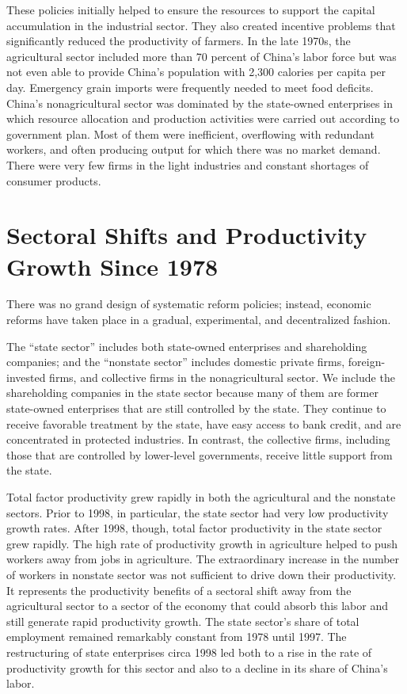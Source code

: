 \documentclass{article}
\begin{document}
    These policies initially helped to ensure the resources to support the capital accumulation in the industrial sector. They also created incentive problems that significantly reduced the productivity of farmers. In the late 1970s, the agricultural sector included more than 70 percent of China’s labor force but was not even able to provide China’s population with 2,300 calories per capita per day. Emergency grain imports were frequently needed to meet food deficits. China’s nonagricultural sector was dominated by the state-owned enterprises in which resource allocation and production activities were carried out according to government plan. Most of them were inefficient, overflowing with redundant workers, and often producing output for which there was no market demand. There were very few firms in the light industries and constant shortages of consumer products.

    \section*{Sectoral Shifts and Productivity Growth Since 1978}
    There was no grand design of systematic reform policies; instead, economic reforms have taken place in a gradual, experimental, and decentralized fashion.

    The “state sector” includes both state-owned enterprises and shareholding companies; and the “nonstate sector” includes domestic private firms, foreign-invested firms, and collective firms in the nonagricultural sector. We include the shareholding companies in the state sector because many of them are former state-owned enterprises that are still controlled by the state. They continue to receive favorable treatment by the state, have easy access to bank credit, and are concentrated in protected industries. In contrast, the collective firms, including those that are controlled by lower-level governments, receive little support from the state.

    Total factor productivity grew rapidly in both the agricultural and the nonstate sectors. Prior to 1998, in particular, the state sector had very low productivity growth rates. After 1998, though, total factor productivity in the state sector grew rapidly. The high rate of productivity growth in agriculture helped to push workers away from jobs in agriculture. The extraordinary increase in the number of workers in nonstate sector was not sufficient to drive down their productivity. It represents the productivity benefits of a sectoral shift away from the agricultural sector to a sector of the economy that could absorb this labor and still generate rapid productivity growth. The state sector’s share of total employment remained remarkably constant from 1978 until 1997. The restructuring of state enterprises circa 1998 led both to a rise in the rate of productivity growth for this sector and also to a decline in its share of China’s labor.
    
\end{document}
